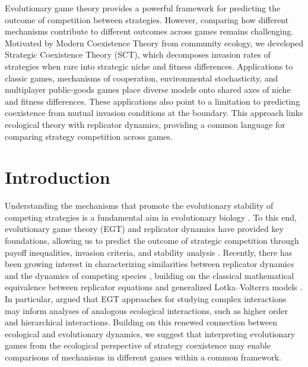 \documentclass[12pt]{article}
\begin{document}
Evolutionary game theory provides a powerful framework for predicting the outcome of competition between strategies.
However, comparing how different mechanisms contribute to different outcomes across games remains challenging. 
Motivated by Modern Coexistence Theory from community ecology, we developed Strategic Coexistence Theory (SCT), which decomposes invasion rates of strategies when rare into strategic niche and fitness differences. 
Applications to classic games, mechanisms of cooperation, environmental stochasticity, and multiplayer public-goods games place diverse models onto shared axes of niche and fitness differences.
These applications also point to a limitation to predicting coexistence from mutual invasion conditions at the boundary.
This approach links ecological theory with replicator dynamics, providing a common language for comparing strategy competition across games.

\section*{Introduction}

Understanding the mechanisms that promote the evolutionary stability of competing strategies is a fundamental aim in evolutionary biology \citep{lewontin1961evolution,slobodkin1964strategy,smith1973logic,taylor1978evolutionary}.
To this end, evolutionary game theory (EGT) and replicator dynamics have provided key foundations, allowing us to predict the outcome of strategic competition through payoff inequalities, invasion criteria, and stability analysis \citep{schuster1983replicator,hofbauer1998evolutionary,cressman2003evolutionary,cressman2014replicator}.
Recently, there has been growing interest in characterizing similarities between replicator dynamics and the dynamics of competing species \citep{gokhale2025higher,tarnita2025reconciling,allesina2026global}, building on the classical mathematical equivalence between replicator equations and generalized Lotka–Volterra models \citep{hofbauer1981occurrence,page2002unifying}.
In particular, \cite{tarnita2025reconciling} argued that EGT approaches for studying complex interactions may inform analyses of analogous ecological interactions, such as higher order and hierarchical interactions.
Building on this renewed connection between ecological and evolutionary dynamics, we suggest that interpreting evolutionary games from the ecological perspective of strategy coexistence may enable comparisons of mechanisms in different games within a common framework.
\end{document}
